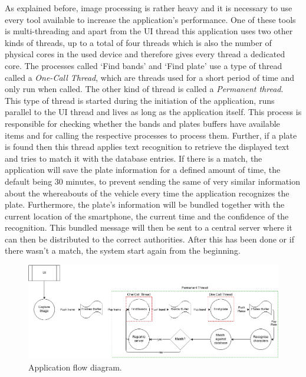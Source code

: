 As explained before, image processing is rather heavy and it is necessary to use every tool available to increase the application's performance. One of these tools is multi-threading and apart from the UI thread this application uses two other kinds of threads, up to a total of four threads which is also the number of physical cores in the used device and therefore gives every thread a dedicated core. The processes called `Find bands' and `Find plate' use a type of thread called a \emph{One-Call Thread}, which are threads used for a short period of time and only run when called. The other kind of thread is called a \emph{Permanent thread}. This type of thread is started during the initiation of the application, runs parallel to the UI thread and lives as long as the application itself. This process is responsible for checking whether the bands and plates buffers have available items and for calling the respective processes to process them. Further, if a plate is found then this thread applies text recognition to retrieve the displayed text and tries to match it with the database entries. If there is a match, the application will save the plate information for a defined amount of time, the default being 30 minutes, to prevent sending the same of very similar information about the whereabouts of the vehicle every time the application recognizes the plate. Furthermore, the plate's information will be bundled together with the current location of the smartphone, the current time and the confidence of the recognition. This bundled message will then be sent to a central server where it can then be distributed to the correct authorities. After this has been done or if there wasn't a match, the system start again from the beginning.


\begin{figure}[ht]
    \centering
    \includegraphics[width=\textwidth]{plaatjes/architecture-RoadEye-parallel}
    \caption{Application flow diagram.}
    \label{fig:architecture}
\end{figure}%

